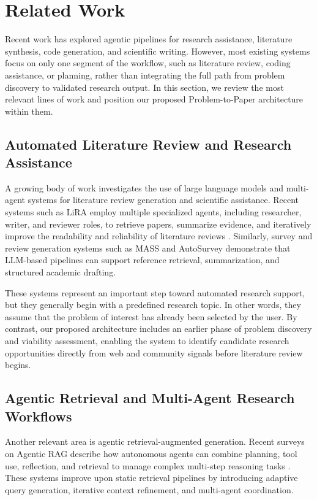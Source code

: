 \documentclass[11pt,a4paper]{article}
\begin{document}
\section{Related Work}

Recent work has explored agentic pipelines for research assistance, literature synthesis, code generation, and scientific writing. However, most existing systems focus on only one segment of the workflow, such as literature review, coding assistance, or planning, rather than integrating the full path from problem discovery to validated research output. In this section, we review the most relevant lines of work and position our proposed Problem-to-Paper architecture within them.

\subsection{Automated Literature Review and Research Assistance}

A growing body of work investigates the use of large language models and multi-agent systems for literature review generation and scientific assistance. Recent systems such as LiRA employ multiple specialized agents, including researcher, writer, and reviewer roles, to retrieve papers, summarize evidence, and iteratively improve the readability and reliability of literature reviews \cite{lira2025,reflexion2023}. Similarly, survey and review generation systems such as MASS and AutoSurvey demonstrate that LLM-based pipelines can support reference retrieval, summarization, and structured academic drafting.

These systems represent an important step toward automated research support, but they generally begin with a predefined research topic. In other words, they assume that the problem of interest has already been selected by the user. By contrast, our proposed architecture includes an earlier phase of problem discovery and viability assessment, enabling the system to identify candidate research opportunities directly from web and community signals before literature review begins.

\subsection{Agentic Retrieval and Multi-Agent Research Workflows}

Another relevant area is agentic retrieval-augmented generation. Recent surveys on Agentic RAG describe how autonomous agents can combine planning, tool use, reflection, and retrieval to manage complex multi-step reasoning tasks \cite{agenticrag2025}. These systems improve upon static retrieval pipelines by introducing adaptive query generation, iterative context refinement, and multi-agent coordination.
\end{document}
